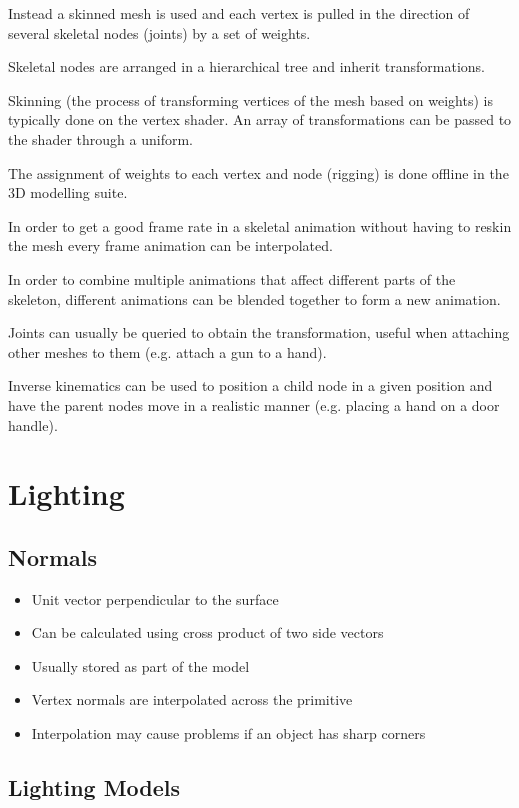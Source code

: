 \documentclass[a4paper]{article}
\begin{document}
Instead a skinned mesh is used and each vertex is pulled in the direction of
several skeletal nodes (joints) by a set of weights.

Skeletal nodes are arranged in a hierarchical tree and inherit transformations.

Skinning (the process of transforming vertices of the mesh based on weights) is
typically done on the vertex shader. An array of transformations can be passed
to the shader through a uniform.

The assignment of weights to each vertex and node (rigging) is done offline in
the 3D modelling suite.

In order to get a good frame rate in a skeletal animation without having to
reskin the mesh every frame animation can be interpolated.

In order to combine multiple animations that affect different parts of the
skeleton, different animations can be blended together to form a new animation.

Joints can usually be queried to obtain the transformation, useful when
attaching other meshes to them (e.g. attach a gun to a hand).

Inverse kinematics can be used to position a child node in a given position and
have the parent nodes move in a realistic manner (e.g. placing a hand on a door
handle).

\section{Lighting}

\subsection{Normals}

\begin{itemize}
  \item Unit vector perpendicular to the surface
  \item Can be calculated using cross product of two side vectors
  \item Usually stored as part of the model
  \item Vertex normals are interpolated across the primitive
  \item Interpolation may cause problems if an object has sharp corners
\end{itemize}

\subsection{Lighting Models}
\end{document}

